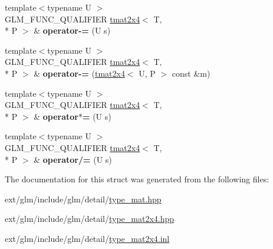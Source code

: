 \begin{DoxyCompactItemize}
\item 
\hypertarget{structglm_1_1tmat2x4_affe8a407491e92988ba4e27c7971013b}{{\footnotesize template$<$typename U $>$ }\\G\-L\-M\-\_\-\-F\-U\-N\-C\-\_\-\-Q\-U\-A\-L\-I\-F\-I\-E\-R \hyperlink{structglm_1_1tmat2x4}{tmat2x4}$<$ T, \\*
P $>$ \& {\bfseries operator-\/=} (U s)}\label{structglm_1_1tmat2x4_affe8a407491e92988ba4e27c7971013b}

\item 
\hypertarget{structglm_1_1tmat2x4_a2413a5e38ef62a695afd3625b576f8a4}{{\footnotesize template$<$typename U $>$ }\\G\-L\-M\-\_\-\-F\-U\-N\-C\-\_\-\-Q\-U\-A\-L\-I\-F\-I\-E\-R \hyperlink{structglm_1_1tmat2x4}{tmat2x4}$<$ T, \\*
P $>$ \& {\bfseries operator-\/=} (\hyperlink{structglm_1_1tmat2x4}{tmat2x4}$<$ U, P $>$ const \&m)}\label{structglm_1_1tmat2x4_a2413a5e38ef62a695afd3625b576f8a4}

\item 
\hypertarget{structglm_1_1tmat2x4_a0df625aa1e2ff9d3bdcec091cfe49938}{{\footnotesize template$<$typename U $>$ }\\G\-L\-M\-\_\-\-F\-U\-N\-C\-\_\-\-Q\-U\-A\-L\-I\-F\-I\-E\-R \hyperlink{structglm_1_1tmat2x4}{tmat2x4}$<$ T, \\*
P $>$ \& {\bfseries operator$\ast$=} (U s)}\label{structglm_1_1tmat2x4_a0df625aa1e2ff9d3bdcec091cfe49938}

\item 
\hypertarget{structglm_1_1tmat2x4_ab5395e4e7c57f59d26790d2d640e4a81}{{\footnotesize template$<$typename U $>$ }\\G\-L\-M\-\_\-\-F\-U\-N\-C\-\_\-\-Q\-U\-A\-L\-I\-F\-I\-E\-R \hyperlink{structglm_1_1tmat2x4}{tmat2x4}$<$ T, \\*
P $>$ \& {\bfseries operator/=} (U s)}\label{structglm_1_1tmat2x4_ab5395e4e7c57f59d26790d2d640e4a81}

\end{DoxyCompactItemize}


The documentation for this struct was generated from the following files\-:\begin{DoxyCompactItemize}
\item 
ext/glm/include/glm/detail/\hyperlink{type__mat_8hpp}{type\-\_\-mat.\-hpp}\item 
ext/glm/include/glm/detail/\hyperlink{type__mat2x4_8hpp}{type\-\_\-mat2x4.\-hpp}\item 
ext/glm/include/glm/detail/\hyperlink{type__mat2x4_8inl}{type\-\_\-mat2x4.\-inl}\end{DoxyCompactItemize}
